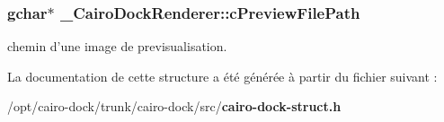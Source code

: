 \subsubsection{\setlength{\rightskip}{0pt plus 5cm}gchar$\ast$ {\bf \_\-CairoDockRenderer::cPreviewFilePath}}\label{struct__CairoDockRenderer_ea4a7566977d2e3417374a7bad340b17}


chemin d'une image de previsualisation. 



La documentation de cette structure a été générée à partir du fichier suivant :\begin{CompactItemize}
\item 
/opt/cairo-dock/trunk/cairo-dock/src/{\bf cairo-dock-struct.h}\end{CompactItemize}
